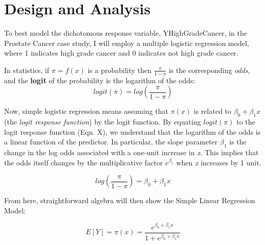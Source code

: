%
%
%

\section{Design and Analysis}
To best model the dichotomous response variable, Y\textunderscore HighGradeCancer, in the Prostate Cancer case study, I will employ a multiple logistic regression model, where 1 indicates high grade cancer and 0 indicates not high grade cancer. \par
In statistics, if \(\pi = f(x)\) is a probability then \(\frac{\pi}{1-\pi}\) is the corresponding \textit{odds}, and the \textbf{logit} of the probability is the logarithm of the odds:
\begin{equation}
	logit(\pi) = log(\frac{\pi}{1-\pi})
\end{equation}


Now, simple logistic regression means assuming that \(\pi(x)\) is related to \(\beta_0 + \beta_1x\) (the \textit{logit response function}) by the logit function. By equating \(logit(\pi)\) to the logit response function (Eqn. X), we understand that the logarithm of the odds is a linear function of the predictor. In particular, the slope parameter \(\beta_1\) is the change in the log odds associated with a one-unit increase in \textit{x}. This implies that the odds itself changes by the multiplicative factor \(e^{\beta_1}\) when \textit{x} increases by 1 unit.

\begin{equation}
	log(\frac{\pi}{1-\pi}) = \beta_0 + \beta_1x
\end{equation}

From here, straightforward algebra will then show the Simple Linear Regression Model:

\begin{equation}
	E[Y] = \pi(x) = \frac{e^{\beta_0 + \beta_1x}}{1+e^{\beta_0 + \beta_1x}}
\end{equation}

 \par

